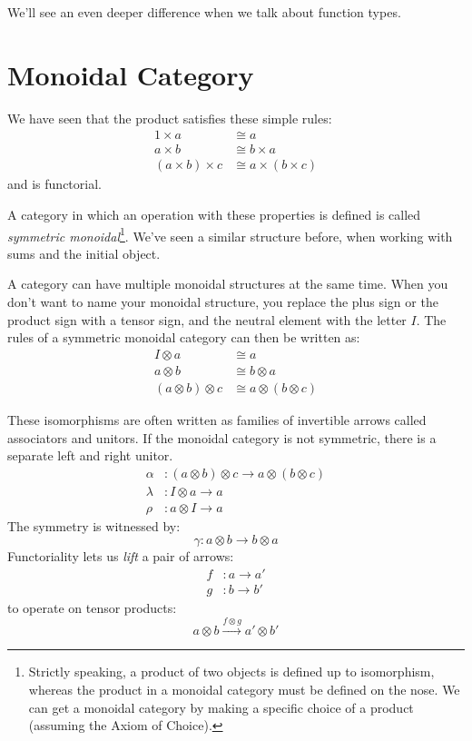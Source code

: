 \documentclass[DaoFP]{subfiles}
\begin{document}
We'll see an even deeper difference when we talk about function types.

\section{Monoidal Category}

We have seen that the product satisfies these simple rules:
\begin{align*}
1 \times a &\cong a
\\
a \times b &\cong b \times a
\\
(a \times b) \times c &\cong a \times (b \times c)
\end{align*}
and is functorial. 

A category in which an operation with these properties is defined is called \emph{symmetric monoidal}\footnote{Strictly speaking, a product of two objects is defined up to isomorphism, whereas the product in a monoidal category must be defined on the nose. We can get a monoidal category by making a specific choice of a product (assuming the Axiom of Choice).}. We've seen a similar structure before, when working with sums and the initial object. 

A category can have multiple monoidal structures at the same time. When you don't want to name your monoidal structure, you replace the plus sign or the product sign with a tensor sign, and the neutral element with the letter $I$. The rules of a symmetric monoidal category can then be written as:
\begin{align*}
I \otimes a &\cong a
\\
a \otimes b &\cong b \otimes a
\\
(a \otimes b) \otimes c &\cong a \otimes (b \otimes c)
\end{align*}

These isomorphisms are often written as families of invertible arrows called associators and unitors. If the monoidal category is not symmetric, there is a separate left and right unitor.
\begin{align*}
\alpha &\colon (a \otimes b) \otimes c \to a \otimes (b \otimes c)
\\
 \lambda &\colon I \otimes a \to a
 \\
 \rho &\colon a \otimes I \to a
\end{align*}
The symmetry is witnessed by:
\[ \gamma \colon a \otimes b \to b \otimes a \]
Functoriality lets us \emph{lift} a pair of arrows:
\begin{align*} 
f &\colon a \to a' \\
g &\colon b \to b'
\end{align*}
 to operate on tensor products:
\[ a \otimes b \xrightarrow{f \otimes g} a' \otimes b' \]
\end{document}
